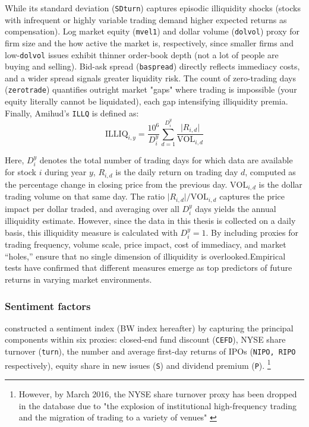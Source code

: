 While its standard deviation (\texttt{SDturn}) captures episodic illiquidity shocks (stocks with infrequent or highly variable trading demand higher expected returns as compensation). Log market equity (\texttt{mvel1}) and dollar volume (\texttt{dolvol}) proxy for firm size and the how active the market is, respectively, since smaller firms and low-\texttt{dolvol} issues exhibit thinner order-book depth (not a lot of people are buying and selling). Bid-ask spread (\texttt{baspread}) directly reflects immediacy costs, and a wider spread signals greater liquidity risk. The count of zero-trading days (\texttt{zerotrade}) quantifies outright market "gaps" where trading is impossible (your equity literally cannot be liquidated), each gap intensifying illiquidity premia. Finally, Amihud's \texttt{ILLQ} is defined as:
\begin{equation}
\label{eq:amihud}
\text{ILLIQ}_{i,y}
=
\frac{10^6}{D_i^y}
\sum_{d=1}^{D_i^y}
\frac{\lvert R_{i,d}\rvert}{\text{VOL}_{i,d}}
\end{equation}

Here, $D_i^y$ denotes the total number of trading days for which data are available for stock $i$ during year $y$, $R_{i,d}$ is the daily return on trading day $d$, computed as the percentage change in closing price from the previous day. $\text{VOL}_{i,d}$ is the dollar trading volume on that same day. The ratio $\lvert R_{i,d}\rvert/\text{VOL}_{i,d}$ captures the price impact per dollar traded, and averaging over all $D_i^y$ days yields the annual illiquidity estimate. However, since the data in this thesis is collected on a daily basis, this illiquidity measure is calculated with $D_i^y = 1$. By including proxies for trading frequency, volume scale, price impact, cost of immediacy, and market “holes,”  ensure that no single dimension of illiquidity is overlooked.Empirical tests have confirmed that different measures emerge as top predictors of future returns in varying market environments.

\subsubsection{Sentiment factors}
 constructed a sentiment index (BW index hereafter) by capturing the principal components within six proxies: closed-end fund discount (\texttt{CEFD}), NYSE share turnover (\texttt{turn}), the number and average first-day returns of IPOs (\texttt{NIPO, RIPO} respectively), equity share in new issues (\texttt{S}) and dividend premium (\texttt{P}). \footnote{However, by March 2016, the NYSE share turnover proxy has been dropped in the database due to "the explosion of institutional high-frequency trading and the migration of trading to a variety of venues" \cite{ung_2023}}

